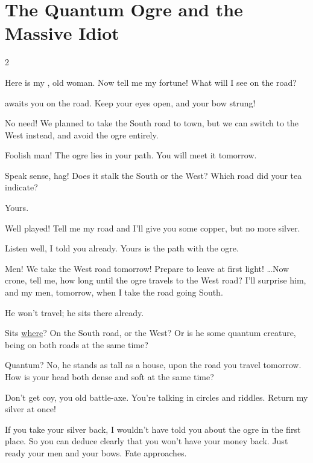 \section*{The Quantum Ogre and the Massive Idiot}

\begin{multicols}{2}
\begin{speechtext}

  Here is my , old woman.
  Now tell me my fortune!
  What will I see on the road?

  {\sffamily {} awaits you on the road.
  Keep your eyes open, and your bow strung!}

  No need!
  We planned to take the South road to town, but we can switch to the West instead, and avoid the \gls{ogre} entirely.

  {\sffamily Foolish man!
  The \gls{ogre} lies in your path.
  You will meet it tomorrow.}

  Speak sense, hag!
  Does it stalk the South or the West?
  Which road did your tea indicate?

  {\sffamily Yours.}

  Well played!
  Tell me my road and I'll give you some copper, but no more silver.

  {\sffamily Listen well, I told you already.
  Yours is the path with the \gls{ogre}.}

  Men!
  We take the West road tomorrow!
  Prepare to leave at first light!
  \ldots Now crone, tell me, how long until the \gls{ogre} travels to the West road?
  I'll surprise him, and my men, tomorrow, when I take the road going South.

  {\sffamily He won't travel; he sits there already.}

  Sits \underline{where}?
  On the South road, or the West?
  Or is he some quantum creature, being on both roads at the same time?

  {\sffamily Quantum?
  No, he stands as tall as a house, upon the road you travel tomorrow.
  How is your head both dense and soft at the same time?}

  Don't get coy, you old battle-axe.
  You're talking in circles and riddles.
  Return my silver at once!

  {\sffamily If you take your silver back, I wouldn't have told you about the \gls{ogre} in the first place.
  So you can deduce clearly that you won't have your money back.
  Just ready your men and your bows.
  Fate approaches.}


\end{speechtext}
\end{multicols}

